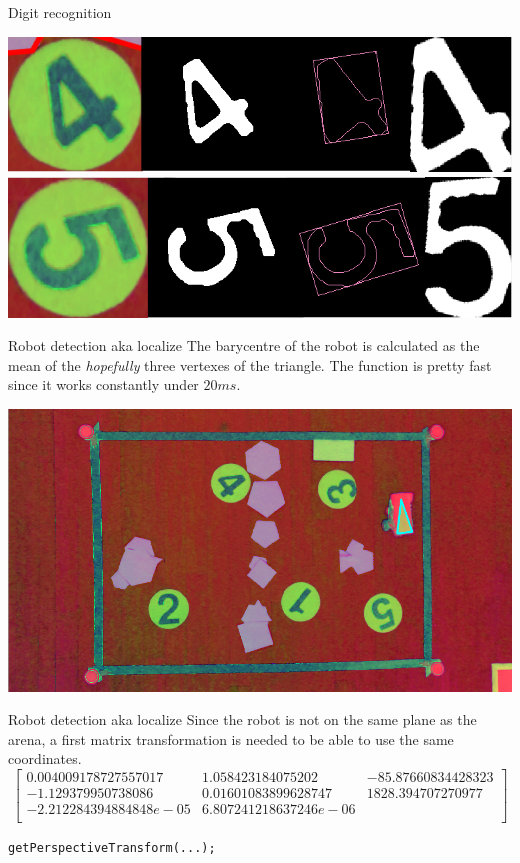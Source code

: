 \begin{frame}[fragile]{Digit recognition}
\begin{center}
	\includegraphics[width=\linewidth]{Immagini/nn4}\\
	\includegraphics[width=\linewidth]{Immagini/nn5}
\end{center} 
\end{frame}

\begin{frame}[fragile]{Robot detection aka localize}
The barycentre of the robot is calculated as the mean of the \textit{hopefully} three vertexes of the triangle. \newline
The function is pretty fast since it works constantly under $20ms$. 
\begin{center}
	\includegraphics[scale=0.25]{Immagini/robot_detection}	
\end{center}
\end{frame}

\begin{frame}[fragile]{Robot detection aka localize}
Since the robot is not on the same plane as the arena, a first matrix transformation is needed to be able to use the same coordinates.  
\otsize
\[
\begin{bmatrix}
0.004009178727557017& 1.058423184075202& -85.87660834428323\\
-1.129379950738086& 0.01601083899628747& 1828.394707270977\\
-2.212284394884848e-05& 6.807241218637246e-06& \\	
\end{bmatrix}
\]
\begin{center}
\texttt{getPerspectiveTransform(...);}
\end{center}
\end{frame}

